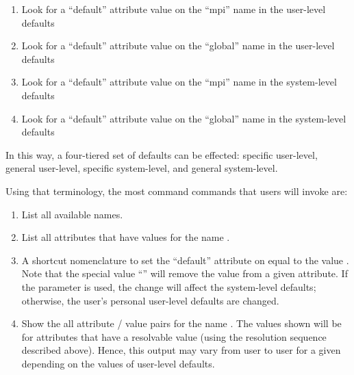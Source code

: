 \begin{enumerate}
\item Look for a ``default'' attribute value on the ``mpi'' name in
  the user-level defaults
  
\item Look for a ``default'' attribute value on the ``global'' name in
  the user-level defaults
  
\item Look for a ``default'' attribute value on the ``mpi'' name in
  the system-level defaults
  
\item Look for a ``default'' attribute value on the ``global'' name in
  the system-level defaults
\end{enumerate}

In this way, a four-tiered set of defaults can be effected: specific
user-level, general user-level, specific system-level, and general
system-level.  

Using that terminology, the most command  commands
that users will invoke are:

\begin{enumerate}
\item {}
  
  List all available names.

\item {}
  
  List all attributes that have values for the name .

\item {} 
  
  A shortcut nomenclature to set the ``default'' attribute on
   equal to the value .  Note that the
  special value ``'' will remove the value from a given
  attribute.  If the  parameter is used, the change will
  affect the system-level defaults; otherwise, the user's personal
  user-level defaults are changed.

\item {}

  Show the all attribute / value pairs for the name .  The
  values shown will be for attributes that have a resolvable value
  (using the resolution sequence described above).  Hence, this output
  may vary from user to user for a given  depending on the
  values of user-level defaults.

\end{enumerate}

